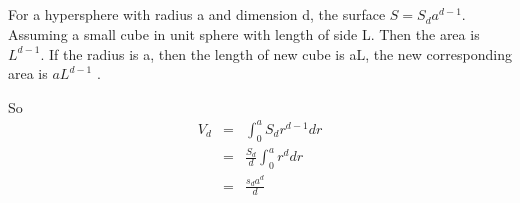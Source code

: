 \documentclass{article} %
\begin{document}






\subsection{}

For a hypersphere with radius a and dimension d, the surface $S = S_d a ^{d-1}$. Assuming a small cube in unit sphere with length of side L. Then the area is $L^{d-1}$. If the radius is a, then the length of new cube is aL, the new corresponding area is $aL^{d-1}$ .

So 
\begin{equation}
    \begin{array}{rcl}
     	V_d  & = &\int_{0}^{a}  S_d r^{d-1} dr \\
	& = & \frac{S_d}{d} \int_{0}^{a} r^d dr \\
	& = & \frac{s_d a^d}{d}
    \end{array}
\end{equation}
\end{document}
